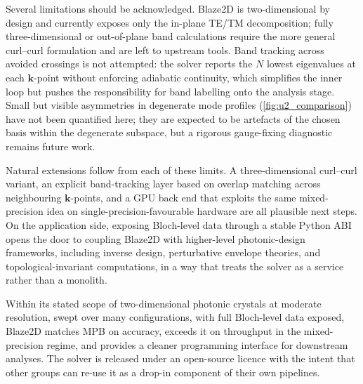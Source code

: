 Several limitations should be acknowledged. Blaze2D is two-dimensional
by design and currently exposes only the in-plane TE/TM
decomposition; fully three-dimensional or out-of-plane band
calculations require the more general curl--curl formulation and are
left to upstream tools. Band tracking across avoided crossings is not
attempted: the solver reports the $N$ lowest eigenvalues at each
$\bm{k}$-point without enforcing adiabatic continuity, which simplifies
the inner loop but pushes the responsibility for band labelling onto
the analysis stage. Small but visible asymmetries in degenerate
mode profiles (\cref{fig:u2_comparison}) have not been quantified
here; they are expected to be artefacts of the chosen basis within the
degenerate subspace, but a rigorous gauge-fixing diagnostic remains
future work.

Natural extensions follow from each of these limits. A
three-dimensional curl--curl variant, an explicit band-tracking layer
based on overlap matching across neighbouring $\bm{k}$-points, and a
GPU back end that exploits the same mixed-precision idea on
single-precision-favourable hardware are all plausible next steps. On
the application side, exposing Bloch-level data through a stable
Python ABI opens the door to coupling Blaze2D with higher-level
photonic-design frameworks, including inverse design, perturbative
envelope theories, and topological-invariant computations, in a way that
treats the solver as a service rather than a monolith.

Within its stated scope of two-dimensional photonic crystals at
moderate resolution, swept over many configurations, with full
Bloch-level data exposed, Blaze2D matches MPB on accuracy, exceeds
it on throughput in the mixed-precision regime, and provides a
cleaner programming interface for downstream analyses. The solver is
released under an open-source licence with the intent that other
groups can re-use it as a drop-in component of their own pipelines.
